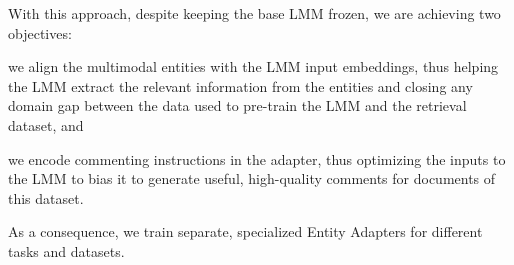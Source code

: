 With this approach, despite keeping the base LMM frozen, we are achieving two objectives: \begin{enumerate*}[label=\arabic*)]\item we align the multimodal entities with the LMM input embeddings, thus helping the LMM extract the relevant information from the entities and closing any domain gap between the data used to pre-train the LMM and the retrieval dataset, and \item we encode commenting instructions in the adapter, thus optimizing the inputs to the LMM to bias it to generate useful, high-quality comments for documents of this dataset. %
\end{enumerate*}
As a consequence, we train separate, specialized Entity Adapters for different tasks and datasets.

%
%




%
%

%

%
%
%
%
%
%
%

%


%
%
%

%
%

%

%

%
%

%
%
%

%

%

%